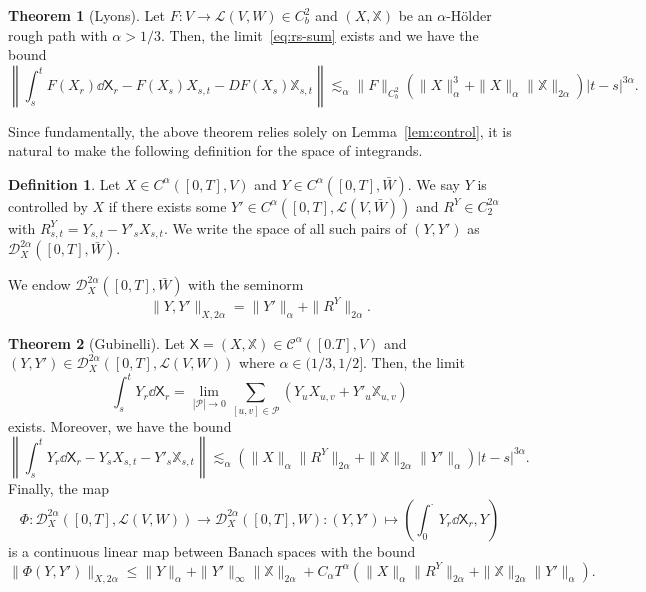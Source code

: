 \documentclass[]{article}
\theoremstyle{definition}
\newtheorem{theorem}{Theorem}
\theoremstyle{definition}
\newtheorem{definition}{Definition}
\begin{document}
\begin{theorem}[Lyons]
  Let \(F : V \to \mathcal{L}(V, W) \in C^2_b\) and \((X, \mathbb{X})\) be an \(\alpha\)-H\"older rough path with \(\alpha > 1/3\).
  Then, the limit~\eqref{eq:rs-sum} exists and we have the bound
  \[\left\|\int_s^t F(X_r) \dd \mathsf{X}_r - F(X_s) X_{s, t} - DF(X_s) \mathbb{X}_{s, t}\right\|
    \lesssim_{\alpha}\|F\|_{C^2_b}(\|X\|^3_\alpha + \|X\|_\alpha\|\mathbb{X}\|_{2\alpha})|t - s|^{3\alpha}.\]
\end{theorem}

Since fundamentally, the above theorem relies solely on Lemma~\ref{lem:control}, it is natural to 
make the following definition for the space of integrands.

\begin{definition}
  Let \(X \in C^\alpha([0, T], V)\) and \(Y \in C^\alpha([0, T], \bar W)\). We say \(Y\) is controlled by \(X\) 
  if there exists some \(Y' \in C^\alpha([0, T], \mathcal{L}(V, \bar W))\) and \(R^Y \in C^{2\alpha}_2\) with 
  \(R^Y_{s, t} = Y_{s, t} - Y'_s X_{s, t}\). We write the space of all such pairs of \((Y, Y')\) as 
  \(\mathcal{D}^{2\alpha}_X([0, T], \bar W)\).
\end{definition}

We endow \(\mathcal{D}^{2\alpha}_X([0, T], \bar W)\) with the seminorm 
\[\|Y, Y'\|_{X, 2\alpha} = \|Y'\|_\alpha + \|R^Y\|_{2\alpha}.\]

\begin{theorem}[Gubinelli]
  Let \(\mathsf{X} = (X, \mathbb{X}) \in \mathcal{C}^\alpha([0. T], V)\) and 
  \((Y, Y') \in \mathcal{D}^{2\alpha}_X([0, T], \mathcal{L}(V, W))\) where \(\alpha \in (1/3, 1/2]\).
  Then, the limit 
  \[\int_s^t Y_r \dd \mathsf{X}_r = \lim_{|\mathcal{P}| \to 0} \sum_{[u, v] \in \mathcal{P}}\left(Y_u X_{u, v} + Y'_u \mathbb{X}_{u, v}\right)\]
  exists. Moreover, we have the bound 
  \[\left\| \int_s^t Y_r \dd \mathsf{X}_r - Y_s X_{s, t} - Y'_s \mathbb{X}_{s, t}\right\| 
    \lesssim_{\alpha} (\|X\|_{\alpha}\|R^Y\|_{2\alpha} + \|\mathbb{X}\|_{2\alpha}\|Y'\|_\alpha)|t - s|^{3\alpha}.\]
  Finally, the map 
  \[\Phi : \mathcal{D}^{2\alpha}_X([0, T], \mathcal{L}(V, W)) \to \mathcal{D}^{2\alpha}_X([0, T], W): 
    (Y, Y') \mapsto \left(\int_0^{\cdot} Y_r \dd \mathsf{X}_r, Y\right)\]
  is a continuous linear map between Banach spaces with the bound 
  \[\|\Phi(Y, Y')\|_{X, 2\alpha} \le \|Y\|_\alpha + \|Y'\|_\infty\|\mathbb{X}\|_{2\alpha} + 
    C_\alpha T^\alpha(\|X\|_\alpha \|R^Y\|_{2\alpha} + \|\mathbb{X}\|_{2\alpha}\|Y'\|_{\alpha}).\] 
\end{theorem}
\end{document}
